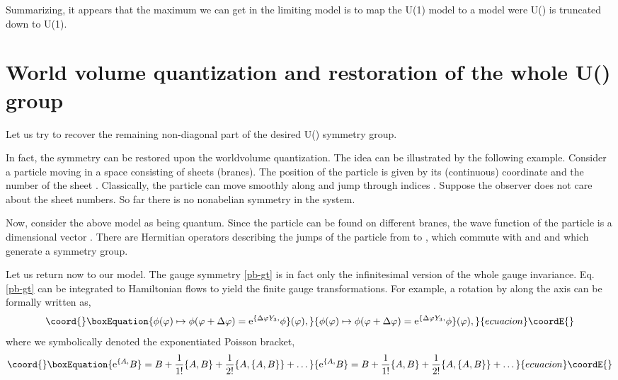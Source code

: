 \documentclass[a4paper]{article}
\providecommand{\e}{\mathrm{e}}
\begin{document}
Summarizing, it appears that the maximum we can get in the
limiting model is to map the U(1) model to a model were U(\coordHE{}) is
truncated down to U(1)\coordHE{}.

\section{World volume quantization and restoration of the whole U(\coordHE{})
group}

Let us try to recover the remaining non-diagonal part of the
desired U(\coordHE{}) symmetry group.

In fact, the symmetry can be restored upon the worldvolume
quantization. The idea can be illustrated by the following
example. Consider a particle moving in a space consisting of \coordHE{}
sheets (branes). The position of the particle is given by its
(continuous) coordinate \coordHE{} and the number of the sheet
\coordHE{}. Classically, the particle can move smoothly along
\coordHE{} and jump through indices \coordHE{}. Suppose the observer does not
care about the sheet numbers. So far there is no nonabelian
symmetry in the system.

Now, consider the above model as being quantum. Since the particle
can be found on different branes, the wave function of the
particle is a \coordHE{} dimensional vector \coordHE{}. There are \coordHE{}
Hermitian operators describing the jumps of the particle from \coordHE{}
to \coordHE{}, which commute with \coordHE{} and \coordHE{} and which generate a \coordHE{}
symmetry group.

Let us return now to our model. The gauge symmetry \eqref{pb-gt} is in
fact only the infinitesimal version of the whole gauge
invariance. Eq. \eqref{pb-gt} can be integrated to Hamiltonian flows
to yield the finite gauge transformations. For example, a rotation by
\myHighlight{$\Delta\varphi$}\coordHE{} along the \coordHE{} axis can be formally written as,
\begin{equation}\coord{}\boxEquation{
\phi(\varphi)\mapsto\phi(\varphi+\Delta\varphi)=\e^{\{\Delta\varphi
Y_3,}\phi\}(\varphi),
}{
\phi(\varphi)\mapsto\phi(\varphi+\Delta\varphi)=\e^{\{\Delta\varphi
Y_3,}\phi\}(\varphi),
}{ecuacion}\coordE{}\end{equation}
where we symbolically denoted the exponentiated Poisson bracket,
\begin{equation}\coord{}\boxEquation{
\e^{\{A,}B\}=B+\frac{1}{1!}\{A,B\}+\frac{1}{2!}\{A,\{A,B\}\}+\dots
}{
\e^{\{A,}B\}=B+\frac{1}{1!}\{A,B\}+\frac{1}{2!}\{A,\{A,B\}\}+\dots
}{ecuacion}\coordE{}\end{equation}
\end{document}
